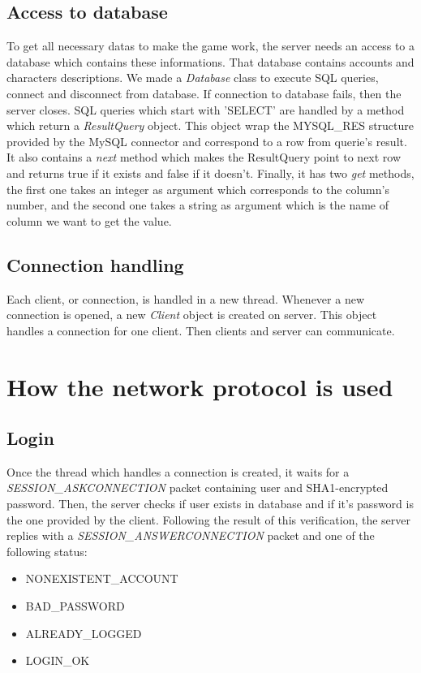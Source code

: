 \documentclass{scrreprt}
\begin{document}
				\subsection{Access to database}
				To get all necessary datas to make the game work, the server needs an access to a database which contains these informations. That database contains accounts and characters descriptions. We made a \emph{Database} class to execute SQL queries, connect and disconnect from database. If connection to database fails, then the server closes. SQL queries which start with 'SELECT' are handled by a method which return a \emph{ResultQuery} object. This object wrap the MYSQL\_RES structure provided by the MySQL connector and correspond to a row from querie's result. It also contains a \emph{next} method which makes the ResultQuery point to next row and returns true if it exists and false if it doesn't. Finally, it has two \emph{get} methods, the first one takes an integer as argument which corresponds to the column's number, and the second one takes a string as argument which is the name of column we want to get the value.
				\subsection{Connection handling}
				Each client, or connection, is handled in a new thread. Whenever a new connection is opened, a new \emph{Client} object is created on server. This object handles a connection for one client. Then clients and server can communicate.

				\section{How the network protocol is used}
				\subsection{Login}
				Once the thread which handles a connection is created, it waits for a \emph{SESSION\_ASKCONNECTION} packet containing user and SHA1-encrypted password. Then, the server checks if user exists in database and if it's password is the one provided by the client. Following the result of this verification, the server replies with a \emph{SESSION\_ANSWERCONNECTION} packet and one of the following status:
				\begin{itemize}
				\item{NONEXISTENT\_ACCOUNT}
				\item{BAD\_PASSWORD}
				\item{ALREADY\_LOGGED}
				\item{LOGIN\_OK}
				\end{itemize}
\end{document}
